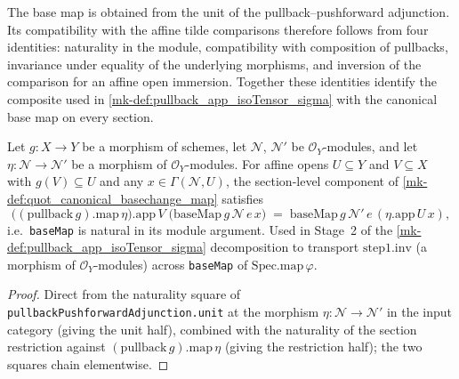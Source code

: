 The base map is obtained from the unit of the pullback--pushforward
adjunction. Its compatibility with the affine tilde comparisons therefore
follows from four identities: naturality in the module, compatibility with
composition of pullbacks, invariance under equality of the underlying
morphisms, and inversion of the comparison for an affine open immersion.
Together these identities identify the composite used in
\ref{mk-def:pullback_app_isoTensor_sigma} with the canonical base map on every
section.

\begin{lemma}
  \label{mk-lem:baseMap_pullbackComp_apply}
  \leanok

  Let \(g : X \to Y\) be a morphism of schemes, let \(\mathcal N\),
  \(\mathcal N'\) be \(\mathcal O_Y\)-modules, and let
  \(\eta : \mathcal N \to \mathcal N'\) be a morphism of
  \(\mathcal O_Y\)-modules. For affine opens \(U \subseteq Y\) and
  \(V \subseteq X\) with \(g(V) \subseteq U\) and any
  \(x \in \Gamma(\mathcal N, U)\), the section-level component of
  \ref{mk-def:quot_canonical_basechange_map} satisfies
  \[
    \bigl((\text{pullback}\,g).\mathrm{map}\,\eta\bigr).\mathrm{app}\,V\;
    \bigl(\text{baseMap}\,g\,\mathcal N\,e\,x\bigr)
    \;=\;
    \text{baseMap}\,g\,\mathcal N'\,e\,(\eta.\mathrm{app}\,U\,x),
  \]
  i.e.\ \texttt{baseMap} is natural in its module argument. Used in
  Stage~2 of the \ref{mk-def:pullback_app_isoTensor_sigma}
  decomposition to transport \(\text{step1}.\mathrm{inv}\) (a
  morphism of \(\mathcal O_Y\)-modules) across \texttt{baseMap} of
  \(\text{Spec.map}\,\varphi\).
\end{lemma}
\begin{proof}
  \leanok
  Direct from the naturality square of
  \texttt{pullbackPushforwardAdjunction.unit} at the morphism
  \(\eta : \mathcal N \to \mathcal N'\) in the input category
  (giving the unit half), combined with the naturality of the
  section restriction against \((\text{pullback}\,g).\mathrm{map}\,\eta\)
  (giving the restriction half); the two squares chain elementwise.
\end{proof}

